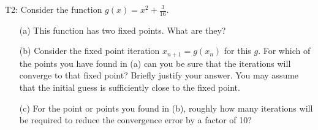 \documentclass[12pt]{report}
\begin{document}


\begin{problem}
    T2: Consider the function $g(x) = x^2 + \frac{3}{16}$.
    \begin{enumerate}
        \item [(a)] This function has two fixed points. What are they?
        \item [(b)] Consider the fixed point iteration $x_{n+1}=g(x_n)$ for this $g$.  For which of the points you have found in (a) can you be sure that the iterations will converge to that fixed point? Briefly justify your answer. You may assume that the initial guess is sufficiently close to the fixed point.
        \item [(c)] For the point or points you found in (b), roughly how many iterations will be required to reduce the convergence error by a factor of 10?
    \end{enumerate}
\end{problem}
\end{document}
